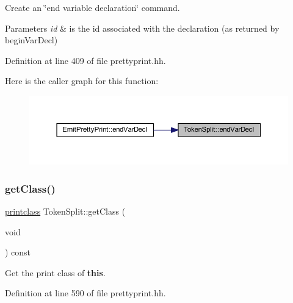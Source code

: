 Create an \char`\"{}end variable declaration\char`\"{} command. 


\begin{DoxyParams}{Parameters}
{\em id} & is the id associated with the declaration (as returned by begin\+Var\+Decl) \\
\hline
\end{DoxyParams}


Definition at line 409 of file prettyprint.\+hh.

Here is the caller graph for this function\+:
\nopagebreak
\begin{figure}[H]
\begin{center}
\leavevmode
\includegraphics[width=350pt]{class_token_split_a6d5be5e7d3d58556488edb57a9ffb74e_icgraph}
\end{center}
\end{figure}
\mbox{\label{class_token_split_a04ab497b5a634461f0c529c33a86ddf4}} 
\subsubsection{\texorpdfstring{getClass()}{getClass()}}
{\footnotesize\ttfamily \mbox{\hyperlink{class_token_split_a995222ab6b324567b96a04b69e9bca27}{printclass}} Token\+Split\+::get\+Class (\begin{DoxyParamCaption}\item[{void}]{ }\end{DoxyParamCaption}) const\hspace{0.3cm}{\ttfamily [inline]}}



Get the print class of {\bfseries{this}}. 



Definition at line 590 of file prettyprint.\+hh.

\mbox{\label{class_token_split_a144780df9772056e838cd27d850ce95d}} 
